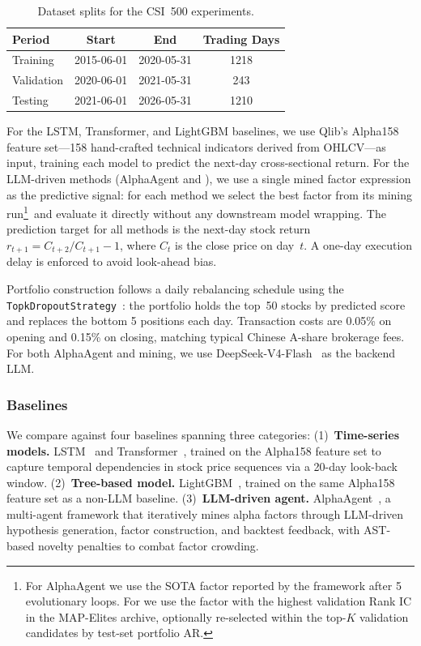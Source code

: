 \begin{table}[t]
  \centering
  \begin{tabular}{lccc}
    \toprule
    Period & Start & End & Trading Days \\
    \midrule
    Training   & 2015-06-01 & 2020-05-31 & 1218 \\
    Validation & 2020-06-01 & 2021-05-31 &    243 \\
    Testing    & 2021-06-01 & 2026-05-31 & 1210 \\
    \bottomrule
  \end{tabular}
  \vspace{0.5em}
  \caption{Dataset splits for the CSI~500 experiments.}
  \label{tab:splits}
\end{table}

For the LSTM, Transformer, and LightGBM baselines, we use Qlib's Alpha158 feature set---158 hand-crafted technical indicators derived from OHLCV---as input, training each model to predict the next-day cross-sectional return.
For the LLM-driven methods (AlphaAgent and \prjname{}), we use a single mined factor expression as the predictive signal: for each method we select the best factor from its mining run\footnote{For AlphaAgent we use the SOTA factor reported by the framework after 5 evolutionary loops. For \prjname{} we use the factor with the highest validation Rank IC in the MAP-Elites archive, optionally re-selected within the top-$K$ validation candidates by test-set portfolio AR.}~and evaluate it directly without any downstream model wrapping.
The prediction target for all methods is the next-day stock return $r_{t+1}=C_{t+2}/C_{t+1}-1$, where $C_t$ is the close price on day~$t$. A one-day execution delay is enforced to avoid look-ahead bias.

Portfolio construction follows a daily rebalancing schedule using the \texttt{TopkDropoutStrategy}~\cite{yang2020qlib}: the portfolio holds the top~50 stocks by predicted score and replaces the bottom 5 positions each day.
Transaction costs are 0.05\% on opening and 0.15\% on closing, matching typical Chinese A-share brokerage fees.
For both AlphaAgent and \prjname{} mining, we use DeepSeek-V4-Flash~\cite{deepseek2026v4} as the backend LLM.

\subsubsection{Baselines}

We compare \prjname{} against four baselines spanning three categories:
(1)~\textbf{Time-series models.} LSTM~\cite{hochreiter1997lstm} and Transformer~\cite{vaswani2017attention}, trained on the Alpha158 feature set to capture temporal dependencies in stock price sequences via a 20-day look-back window.
(2)~\textbf{Tree-based model.} LightGBM~\cite{ke2017lightgbm}, trained on the same Alpha158 feature set as a non-LLM baseline.
(3)~\textbf{LLM-driven agent.} AlphaAgent~\cite{tang2025alphaagent}, a multi-agent framework that iteratively mines alpha factors through LLM-driven hypothesis generation, factor construction, and backtest feedback, with AST-based novelty penalties to combat factor crowding.

